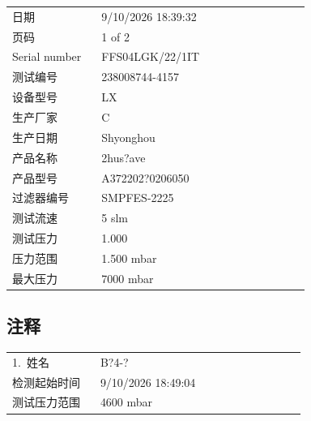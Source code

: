 \documentclass[UTF8,10pt,a4paper,fontset=fandol]{ctexart}
\newcommand{\fieldvalue}[1]{#1}
\newcommand{\handwritten}[1]{#1}
\begin{document}
\begin{tabular}{@{}p{0.27\linewidth}p{0.63\linewidth}@{}}
日期 &
\fieldvalue{9/10/2026 18:39:32}
\\
页码 &
\fieldvalue{1 of 2}
\\
Serial number &
\fieldvalue{FFS04LGK/22/1IT}
\\
测试编号 &
\fieldvalue{238008744-4157}
\\
设备型号 &
\fieldvalue{LX}
\\
生产厂家 &
\fieldvalue{C}
\\
生产日期 &
\fieldvalue{Shyonghou}
\\
产品名称 &
\fieldvalue{2hus?ave}
\\
产品型号 &
\fieldvalue{A372202?0206050}
\\
过滤器编号 &
\fieldvalue{SMPFES-2225}
\\
测试流速 &
\fieldvalue{5 slm}
\\
测试压力 &
\fieldvalue{1.000}
\\
压力范围 &
\fieldvalue{1.500 mbar}
\\
最大压力 &
\fieldvalue{7000 mbar}
\end{tabular}

\subsection*{注释}

\begin{tabular}{@{}p{0.27\linewidth}p{0.63\linewidth}@{}}
1.\ 姓名 &
\fieldvalue{\handwritten{B?4-?}}
\\
检测起始时间 &
\fieldvalue{9/10/2026 18:49:04}
\\
测试压力范围 &
\fieldvalue{4600 mbar}
\end{tabular}
\end{document}

